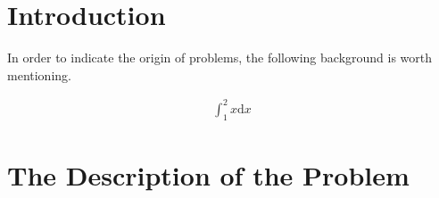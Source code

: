 \documentclass{apmcmthesis}
\begin{document}
\pagestyle{frontmatterstyle}

\begin{abstract}
  \verb|apmcmthesis| \LaTeX{} template is designed by \url{https://www.latexstudio.net} for \url{http://www.apmcm.org}. The template is designed to let everyone focus on the content writing of the paper, without spending too much effort on the customization and adjustment of the format.

  Note that users need to have some experience with \LaTeX{}, at least some of the features of common macro packages, such as references, math formulas, image usage, list environment, etc. Templates have added commonly used macros. Package, no additional user added.

  This template is located on   \url{https://github.com/latexstudio/APMCMThesis}. You can update files from the repository.


\end{abstract}



\newpage
\tableofcontents


\newpage
\pagestyle{mainmatterstyle}
\setcounter{page}{1}
\section{Introduction}
In order to indicate the origin of problems, the following background is worth mentioning.\cite{4}

\begin{align*}
  \int^2_1 x \mathrm{d} x
\end{align*}

\subsection{}


\subsection{}



\subsection{}


\section{The Description of the Problem}
\end{document}
